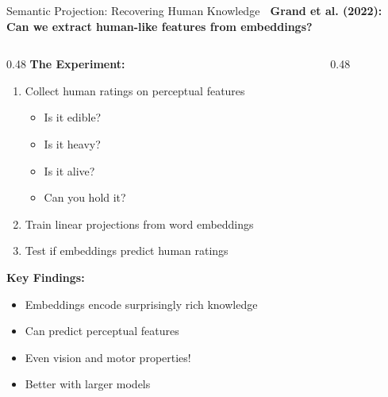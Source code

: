\documentclass[aspectratio=169]{beamer}
\begin{document}
\begin{frame}[shrink=10]{Semantic Projection: Recovering Human Knowledge 🔬}
\textbf{Grand et al. (2022): Can we extract human-like features from embeddings?}

\vspace{1em}

\begin{columns}[T]
\begin{column}{0.48\textwidth}
\textbf{The Experiment:}
\begin{enumerate}\setlength{\itemsep}{0pt}
    \item Collect human ratings on perceptual features
    \begin{itemize}\setlength{\itemsep}{0pt}
        \item Is it edible?
        \item Is it heavy?
        \item Is it alive?
        \item Can you hold it?
    \end{itemize}
    \item Train linear projections from word embeddings
    \item Test if embeddings predict human ratings
\end{enumerate}

\vspace{0.5em}
\textbf{Key Findings:}
\begin{itemize}\setlength{\itemsep}{0pt}
    \item Embeddings encode surprisingly rich knowledge
    \item Can predict perceptual features
    \item Even vision and motor properties!
    \item Better with larger models
\end{itemize}
\end{column}

\begin{column}{0.48\textwidth}
\begin{center}
\end{center}
\end{column}
\end{columns}
\end{frame}
\end{document}
